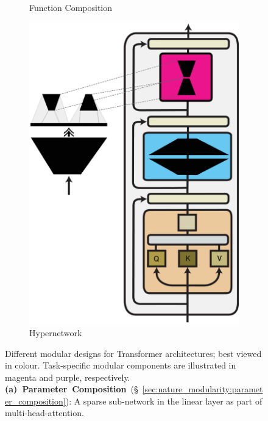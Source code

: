 \documentclass[10pt]{article} %
\begin{document}
\begin{figure}[t]
\begin{subfigure}{.24\linewidth}
        \vspace{0.5em}
        \caption{Function Composition}
        \label{fig:nature_modularity:function_composition}
    \end{subfigure}
    \begin{subfigure}{.24\linewidth}
    \centering
        \includegraphics[width=.99\linewidth]{img/Nature_of_modularity_4.pdf}  
        \caption{Hypernetwork}
        \label{fig:nature_modularity:hyper_network}
    \end{subfigure}
    \caption{Different modular designs for Transformer architectures; best viewed in colour. Task-specific modular components are illustrated in magenta and purple, respectively. 
    \textbf{(a)~Parameter~Composition}~(\S~\ref{sec:nature_modularity:parameter_composition}): A sparse sub-network in the linear layer as part of multi-head-attention.
}
\end{figure}
\end{document}
